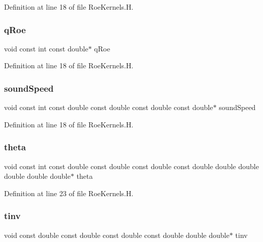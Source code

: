 Definition at line 18 of file Roe\+Kernels.\+H.

\hypertarget{RoeKernels_8H_a1d673d40f8fa40c8e56ed0d69021e9dc}{}\label{RoeKernels_8H_a1d673d40f8fa40c8e56ed0d69021e9dc} 
\subsubsection{\texorpdfstring{q\+Roe}{qRoe}}
{\footnotesize\ttfamily void const int const double$\ast$ q\+Roe}



Definition at line 18 of file Roe\+Kernels.\+H.

\hypertarget{RoeKernels_8H_ab66f723f3c3d8399c4428802a1142be0}{}\label{RoeKernels_8H_ab66f723f3c3d8399c4428802a1142be0} 
\subsubsection{\texorpdfstring{sound\+Speed}{soundSpeed}}
{\footnotesize\ttfamily void const int const double const double const double const double$\ast$ sound\+Speed}



Definition at line 18 of file Roe\+Kernels.\+H.

\hypertarget{RoeKernels_8H_adb6f64e825dfbb4917994d2d1f934f17}{}\label{RoeKernels_8H_adb6f64e825dfbb4917994d2d1f934f17} 
\subsubsection{\texorpdfstring{theta}{theta}}
{\footnotesize\ttfamily void const int const double const double const double const double double double double double double$\ast$ theta}



Definition at line 23 of file Roe\+Kernels.\+H.

\hypertarget{RoeKernels_8H_a9698f37ae98c96f7f647e1cf16a18ac3}{}\label{RoeKernels_8H_a9698f37ae98c96f7f647e1cf16a18ac3} 
\subsubsection{\texorpdfstring{tinv}{tinv}}
{\footnotesize\ttfamily void const double const double const double const double double double$\ast$ tinv}



